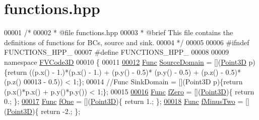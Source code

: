 \hypertarget{functions_8hpp_source}{}\section{functions.\+hpp}
\label{functions_8hpp_source}

\begin{DoxyCode}
00001 \textcolor{comment}{/*}
00002 \textcolor{comment}{ *  @file functions.hpp}
00003 \textcolor{comment}{ *  @brief This file contains the definitions of functions for BCs, source and sink.}
00004 \textcolor{comment}{ */}
00005 
00006 \textcolor{preprocessor}{#ifndef FUNCTIONS\_HPP\_}
00007 \textcolor{preprocessor}{#define FUNCTIONS\_HPP\_}
00008 
00009 \textcolor{keyword}{namespace }\hyperlink{namespaceFVCode3D}{FVCode3D}
00010 \{
00011 
\hypertarget{functions_8hpp_source.tex_l00012}{}\hyperlink{namespaceFVCode3D_ae98a1f1ab0fce8db57176a4a9f91b2d0}{00012} \hyperlink{namespaceFVCode3D_a38fa3b2520ad364d2c3d56ea5077826a}{Func} \hyperlink{namespaceFVCode3D_ae98a1f1ab0fce8db57176a4a9f91b2d0}{SourceDomain} = [](\hyperlink{classFVCode3D_1_1Point3D}{Point3D} p)\{\textcolor{keywordflow}{return} ((p.x() - 1.)*(p.x() - 1.) + (p.y() - 0.5)*
      (p.y() - 0.5) + (p.z() - 0.5)*(p.z()
00013 - 0.5)) < 1;\};
00014 \textcolor{comment}{//Func SinkDomain = [](Point3D p)\{return (p.x()*p.x() + p.y()*p.y()) < 1;\};}
00015 
\hypertarget{functions_8hpp_source.tex_l00016}{}\hyperlink{namespaceFVCode3D_a2e72cc81c6f214d6e057af7a02599501}{00016} \hyperlink{namespaceFVCode3D_a38fa3b2520ad364d2c3d56ea5077826a}{Func} \hyperlink{namespaceFVCode3D_a2e72cc81c6f214d6e057af7a02599501}{fZero} = [](\hyperlink{classFVCode3D_1_1Point3D}{Point3D})\{ \textcolor{keywordflow}{return} 0.; \};
\hypertarget{functions_8hpp_source.tex_l00017}{}\hyperlink{namespaceFVCode3D_a1a9ede09c77441d292a079fbab60fb82}{00017} \hyperlink{namespaceFVCode3D_a38fa3b2520ad364d2c3d56ea5077826a}{Func} \hyperlink{namespaceFVCode3D_a1a9ede09c77441d292a079fbab60fb82}{fOne} = [](\hyperlink{classFVCode3D_1_1Point3D}{Point3D})\{ \textcolor{keywordflow}{return} 1.; \};
\hypertarget{functions_8hpp_source.tex_l00018}{}\hyperlink{namespaceFVCode3D_aafe19d9d844e6d7ec5cc316a921b91ea}{00018} \hyperlink{namespaceFVCode3D_a38fa3b2520ad364d2c3d56ea5077826a}{Func} \hyperlink{namespaceFVCode3D_aafe19d9d844e6d7ec5cc316a921b91ea}{fMinusTwo} = [](\hyperlink{classFVCode3D_1_1Point3D}{Point3D})\{ \textcolor{keywordflow}{return} -2.; \};

\end{DoxyCode}

